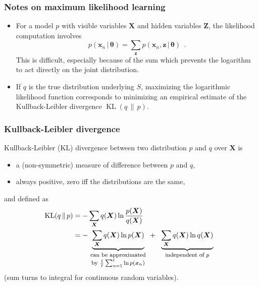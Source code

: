 \documentclass[11pt,mathserif]{beamer}
\renewcommand{\vec}[1]{{\boldsymbol{ #1}}}
\newcommand{\KL}{\operatorname{KL}}
\newcommand{\fub}[2]{\underset{\begin{minipage}{3cm}\footnotesize\centering
      #2\end{minipage}}{\underbrace{#1}}}
\newcommand{\xb}{\vec{x}}
\begin{document}
\begin{frame}
\frametitle{Notes on maximum likelihood learning}
\begin{itemize}\itemsep2ex
\item For a  model $p$ with visible variables $\vec X$ and
  hidden variables $\vec Z$, the likelihood computation involves 
\[
p(\xb_n\,|\,\vec\theta) = \sum_{\vec z} p(\xb_n,\vec z\,|\,\vec\theta)\enspace.
\]
This is difficult, especially because of the sum which prevents the logarithm to
act directly on  the joint distribution. \pause
\item If $q$ is the true distribution underlying $S$, maximizing the
  logarithmic likelihood function corresponds to minimizing an
  empirical estimate of the Kullback-Leibler divergence
  $\KL(q\,\|\,p)$.
\end{itemize}
\end{frame}





\begin{frame}
\frametitle{Kullback-Leibler divergence}
Kullback-Leibler (KL) divergence between two distribution $p$ and $q$
over $\vec X$  is 
\begin{itemize}%
\item a (non-symmetric) measure of
  difference between
$p$ and $q$,
\item always positive, zero iff the distributions are the same,
\end{itemize}\pause
and defined as
\begin{align*}
\KL(q\,\|\,p) 
&= -\sum_{\vec X} q(\vec
X)\ln\frac{p(\vec X)}{q(\vec X)} \\
 &= -\fub{\sum_{\vec X} q(\vec
X)\ln p(\vec X)}{can be approximated by $\frac{1}{\ell}\sum_{n=1}^{\ell} \ln p(\xb_n)$}  +\fub{\sum_{\vec X} q(\vec
X)\ln      {q(\vec X)}}{{independent of $p$}}
\end{align*}
 (sum turns to integral for
  continuous random variables).
\end{frame}


%
%
\end{document}
